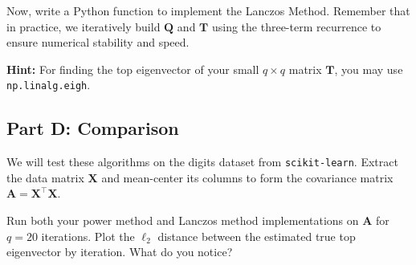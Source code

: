 \documentclass{article}
\begin{document}
Now, write a Python function to implement the Lanczos Method. Remember that in practice, we iteratively build \(\mathbf{Q}\) and \(\mathbf{T}\) using the three-term recurrence to ensure numerical stability and speed.

\textbf{Hint:} For finding the top eigenvector of your small \(q \times q\) matrix \(\mathbf{T}\), you may use \texttt{np.linalg.eigh}.

\hypertarget{part-d-comparison}{%
\subsection*{Part D: Comparison}\label{part-d-comparison}}

We will test these algorithms on the digits dataset from \texttt{scikit-learn}. Extract the data matrix \(\mathbf{X}\) and mean-center its columns to form the covariance matrix \(\mathbf{A} = \mathbf{X}^\top \mathbf{X}\).

Run both your power method and Lanczos method implementations on \(\mathbf{A}\) for \(q=20\) iterations. Plot the \(\ell_2\) distance between the estimated true top eigenvector by iteration. What do you notice?
\end{document}
